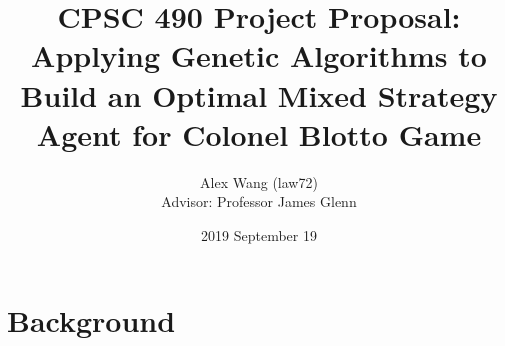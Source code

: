 \documentclass[12pt,letter]{article}
\begin{document}


\title{CPSC 490 Project Proposal: \\
       Applying Genetic Algorithms to Build an Optimal Mixed Strategy Agent for Colonel Blotto Game}

\author{Alex Wang (law72)\\
   		Advisor: Professor James Glenn}

\date{2019 September 19}
 
\maketitle 
\newtheorem{lemma}[theorem]{Lemma}
\newtheorem{prop}{Proposition}

\newcommand{\R}{\mathbb{R}}
\newcommand{\Z}{\mathbb{Z}}
\newcommand{\N}{\mathbb{N}}
\newcommand{\C}{\mathbb{C}}
\newcommand{\Q}{\mathbb{Q}}
\newcommand{\F}{\mathbb{F}}
\newcommand{\K}{\mathcal{K}}
\newcommand{\IdTwo}{\begin{pmatrix} 1 & 0\\0 & 1 \end{pmatrix}}
\newcommand{\abs}[1]{\left| #1 \right|}

\newcommand{\twodiagmat}[2]{\begin{pmatrix} #1 & 0\\0 & #2 \end{pmatrix}}
\newcommand{\pf}{\vskip 5pt \noindent \textit{Proof. }}
\newcommand{\sol}{\vskip 5pt \noindent \textit{Solution. }}

\newcommand{\pfi}{\vskip 5pt \noindent \textit{Proof by induction. }}
\renewcommand{\qed}{\hfill $\square$}
\newcommand{\assoc}{\text{ [associativity]}}
\newcommand{\aut}{\text{Aut}}
\newcommand{\inn}{\text{Inn}}
\newcommand\barbelow[1]{\stackunder[1.2pt]{$#1$}{\rule{.8ex}{.075ex}}}

\newcommand{\glv}{\text{GL}(V)}
\newcommand{\gln}{\text{GL}_n(\F_p)}
\newcommand{\Mod}[1]{\ (\mathrm{mod}\ #1)}
\newcommand{\Var}[1]{\mathrm{Var}(#1)}
\newcommand{\w}[1]{\overline{#1}}
\newcommand{\eet}{e^{i\theta}}
\newcommand{\eent}{e^{-i\theta}}
\newcommand{\eit}{e^{it}}
\newcommand{\enit}{e^{-it}}

\newcommand{\interior}[1]{%
  {\kern0pt#1}^{\mathrm{o}}%
}

\section{Background} %
\end{document}
